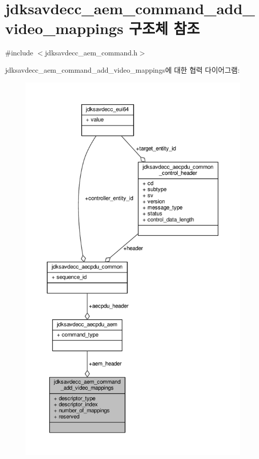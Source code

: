 \hypertarget{structjdksavdecc__aem__command__add__video__mappings}{}\section{jdksavdecc\+\_\+aem\+\_\+command\+\_\+add\+\_\+video\+\_\+mappings 구조체 참조}
\label{structjdksavdecc__aem__command__add__video__mappings}


{\ttfamily \#include $<$jdksavdecc\+\_\+aem\+\_\+command.\+h$>$}



jdksavdecc\+\_\+aem\+\_\+command\+\_\+add\+\_\+video\+\_\+mappings에 대한 협력 다이어그램\+:
\nopagebreak
\begin{figure}[H]
\begin{center}
\leavevmode
\includegraphics[height=550pt]{structjdksavdecc__aem__command__add__video__mappings__coll__graph}
\end{center}
\end{figure}
